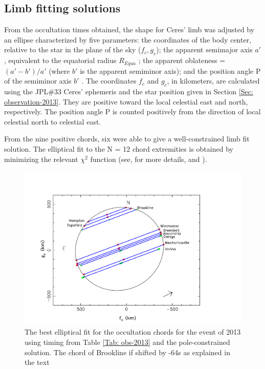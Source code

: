 \documentclass[useAMS,usenatbib]{mn2e}
\begin{document}
\subsection{Limb fitting solutions}

From the occultation times obtained, the shape for Ceres' limb was adjusted by an ellipse characterized by five parameters: the coordinates of the body center, relative to the star in the plane of the sky ($f_{c}, g_{c}$); the apparent semimajor axis $a'$, equivalent to the equatorial radius $R_{Equa}$ ; the apparent oblateness = $(a'-b')/a'$ (where $b'$ is the apparent semiminor axis); and the position angle P of the semiminor axis $b'$ . The coordinates $f_{c}$ and $g_{c}$, in kilometers, are calculated using the JPL\#33  Ceres' ephemeris and the star position given in Section \ref{Sec: observation-2013}. They are positive toward the local celestial east and north, respectively.  The position angle P is counted positively from the direction of local celestial north to celestial east.

From the nine positive chords, six were able to give a well-constrained limb fit solution. The elliptical fit to the N = 12
chord extremities is obtained by minimizing the relevant $\chi^{2}$ function (see, for more details, \cite{Sicardy2011} and \cite{BragaRibas2013}).





\begin{figure}
\includegraphics[scale=0.36]{figures/Ceres_2013_body.pdf}
\caption{The best elliptical fit for the occultation chords for the event of 2013 using timing from Table \ref{Tab: obs-2013} and the pole-constrained solution. The chord of Brookline if shifted by -64s as explained in the text\label{Fig: Ceres-2013-body}}
\end{figure}
\end{document}

